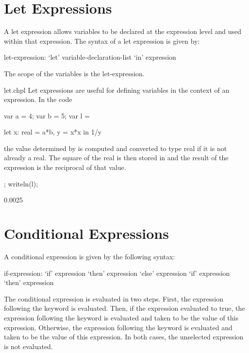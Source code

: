 \section{Let Expressions}
\label{Let_Expressions}

A let expression allows variables to be declared at the expression
level and used within that expression.  The syntax of a let expression
is given by:
\begin{syntax}
let-expression:
  `let' variable-declaration-list `in' expression
\end{syntax}
The scope of the variables is the let-expression.
\begin{chapelexample}{let.chpl}
Let expressions are useful for defining variables in the context of
an expression.  In the code
\begin{chapelnoprint}
  var a = 4;
  var b = 5;
  var l =
\end{chapelnoprint}
\begin{chapel}
  let x: real = a*b, y = x*x in 1/y
\end{chapel}
the value determined by  is computed and converted to type
real if it is not already a real.  The square of the real is then
stored in  and the result of the expression is the reciprocal
of that value.
\begin{chapelnoprint}
  ;
  writeln(l);
\end{chapelnoprint}
\begin{chapeloutput}
0.0025
\end{chapeloutput}
\end{chapelexample}

\section{Conditional Expressions}
\label{Conditional_Expressions}

A conditional expression is given by the following syntax:
\begin{syntax}
if-expression:
  `if' expression `then' expression `else' expression
  `if' expression `then' expression
\end{syntax}
The conditional expression is evaluated in two steps.  First, the
expression following the  keyword is evaluated.  Then, if the
expression evaluated to true, the expression following the 
keyword is evaluated and taken to be the value of this expression.
Otherwise, the expression following the  keyword is
evaluated and taken to be the value of this expression.  In both
cases, the unselected expression is not evaluated.

